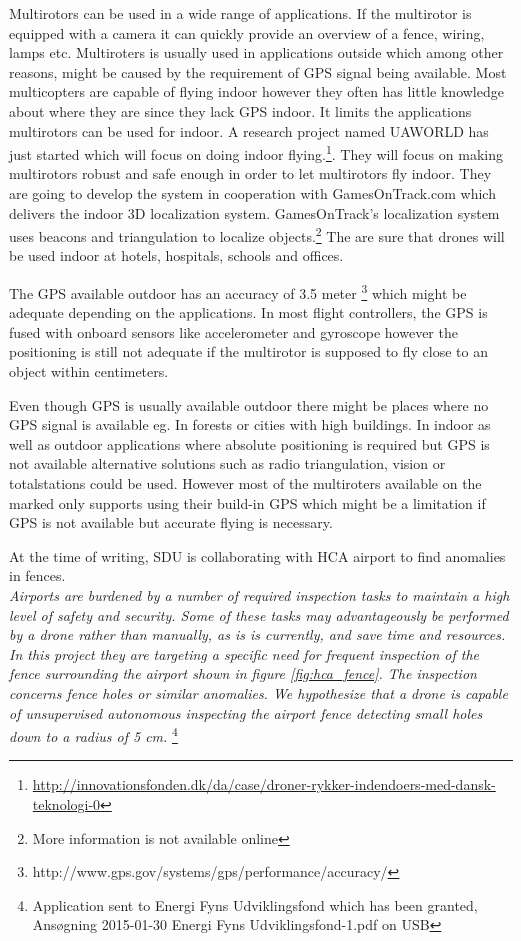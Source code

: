 Multirotors can be used in a wide range of applications.
If the multirotor is equipped with a camera it can quickly provide an overview of a fence, wiring, lamps etc. Multiroters is usually used in applications outside which among other reasons, might be caused by the requirement of GPS signal being available.
Most multicopters are capable of flying indoor however they often has little knowledge about where they are since they lack GPS indoor. It limits the applications multirotors can be used for indoor. 
A research project named UAWORLD has just started which will focus on doing indoor flying.\footnote{\url{http://innovationsfonden.dk/da/case/droner-rykker-indendoers-med-dansk-teknologi-0}}. They will focus on making multirotors robust and safe enough in order to let multirotors fly indoor. They are going to develop the system in cooperation with GamesOnTrack.com which delivers the indoor 3D localization system. GamesOnTrack's localization system uses beacons and triangulation to localize objects.\footnote{More information is not available online} The are sure that drones will be used indoor at hotels, hospitals, schools and offices. 

The GPS available outdoor has an accuracy of 3.5 meter \footnote{http://www.gps.gov/systems/gps/performance/accuracy/} which might be adequate depending on the applications. In most flight controllers, the GPS is fused with onboard sensors like accelerometer and gyroscope however the positioning is still not adequate if the multirotor is supposed to fly close to an object within centimeters. 

Even though GPS is usually available outdoor there might be places where no GPS signal is available eg. In forests or cities with high buildings. 
In indoor as well as outdoor applications where absolute positioning is required but GPS is not available alternative solutions such as radio triangulation, vision or totalstations could be used. 
However most of the multiroters available on the marked only supports using their build-in GPS which might be a limitation if GPS is not available but accurate flying is necessary.


At the time of writing, SDU is collaborating with HCA airport to find anomalies in fences.\\ 
\textit{Airports are burdened by a number of required inspection tasks to maintain a high level of safety and security.
Some of these tasks may advantageously be performed by a drone rather than manually, as is is currently, and save time and resources.
In this project they are targeting a specific need for frequent inspection of the fence surrounding the airport shown in figure \ref{fig:hca_fence}. 
The inspection concerns fence holes or similar anomalies. We hypothesize that a drone is 
capable of unsupervised autonomous inspecting the airport fence detecting small holes down 
to a radius of 5 cm.} \footnote{Application sent to Energi Fyns Udviklingsfond which has been granted, Ansøgning 2015-01-30 Energi Fyns Udviklingsfond-1.pdf on USB}

